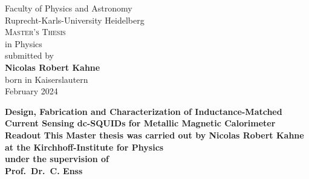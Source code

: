 \begin{titlepage}
	
	\thispagestyle{empty}
	\linespread{1.6}     %
	\large
	\begin{center}
		{\Huge Faculty of Physics and Astronomy}\\
		{\LARGE Ruprecht-Karls-University Heidelberg}\\
		\vspace{2cm}
		\vfill
		\linespread{1.3}
		\textsc{Master's Thesis}\\ 
		\vspace{-0.2cm}
		in Physics \\
		\bigskip
		submitted by\\
		\vspace{-0.2cm}
		\textbf{Nicolas Robert Kahne}\\
		\vspace{-0.2cm}
		born in Kaiserslautern\\
		\bigskip
		February 2024
	\end{center}
\end{titlepage}


\begin{titlepage}
	\thispagestyle{empty}
	\linespread{1.3}     %
	\begin{center}
		\bf
		\Large
		Design, Fabrication and Characterization of Inductance-Matched Current Sensing dc-SQUIDs for Metallic Magnetic Calorimeter Readout
		\rm	
		\large
		\vfill
		This Master thesis was carried out by Nicolas Robert Kahne \\
		at the Kirchhoff-Institute for Physics\\
		under the supervision of\\
		\textbf{Prof.\ Dr.\ C. Enss}
	\end{center}
\end{titlepage}



